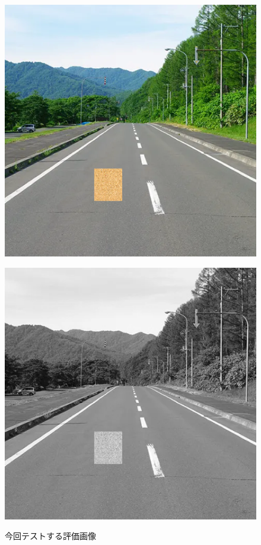 \documentclass[paper]{ieicej}
\begin{document}
\begin{figure}[tb]
  \begin{minipage}[]{0.49\columnwidth}
    \centering
    \includegraphics[width=0.9\columnwidth]{figures/Ex_re3.png}
    \label{fig:3-1-5}
  \end{minipage}
  \begin{minipage}[]{0.49\linewidth}
    \centering
    \includegraphics[width=0.9\columnwidth]{figures/Ex_re4.png}
    \label{fig:3-1-6}
  \end{minipage}
  \caption{今回テストする評価画像}
  \label{fig:3-1-4}
\end{figure}
\end{document}
